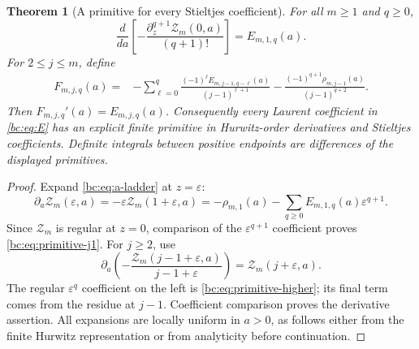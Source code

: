 \documentclass[11pt,letterpaper]{article}
\numberwithin{equation}{section}
\newtheorem{theorem}{Theorem}[section]
\theoremstyle{definition}
\theoremstyle{remark}
\newcommand{\bcZ}{\mathcal Z}
\begin{document}
\begin{theorem}[A primitive for every Stieltjes coefficient]
\label{bc:thm:primitives}
For all $m\ge1$ and $q\ge0$,
\begin{equation}\label{bc:eq:primitive-j1}
 \frac{d}{da}\left[-\frac{\partial_z^{q+1}\bcZ_m(0,a)}{(q+1)!}\right]
        =E_{m,1,q}(a).
\end{equation}
For $2\le j\le m$, define
\begin{align}
 F_{m,j,q}(a)={}&-
  \sum_{\ell=0}^{q}\frac{(-1)^\ell E_{m,j-1,q-\ell}(a)}{(j-1)^{\ell+1}}
  -\frac{(-1)^{q+1}\rho_{m,j-1}(a)}{(j-1)^{q+2}}.
 \label{bc:eq:primitive-higher}
\end{align}
Then $F_{m,j,q}'(a)=E_{m,j,q}(a)$. Consequently every Laurent
coefficient in \eqref{bc:eq:E} has an explicit finite primitive in
Hurwitz-order derivatives and Stieltjes coefficients. Definite
integrals between positive endpoints are differences of the displayed
primitives.
\end{theorem}
\begin{proof}
Expand \eqref{bc:eq:a-ladder} at $z=\varepsilon$:
\[
 \partial_a\bcZ_m(\varepsilon,a)
   =-\varepsilon\bcZ_m(1+\varepsilon,a)
   =-\rho_{m,1}(a)-\sum_{q\ge0}E_{m,1,q}(a)\varepsilon^{q+1}.
\]
Since $\bcZ_m$ is regular at $z=0$, comparison of the
$\varepsilon^{q+1}$ coefficient proves
\eqref{bc:eq:primitive-j1}. For $j\ge2$, use
\[
 \partial_a\left(-\frac{\bcZ_m(j-1+\varepsilon,a)}{j-1+\varepsilon}\right)
     =\bcZ_m(j+\varepsilon,a).
\]
The regular $\varepsilon^q$ coefficient on the left is
\eqref{bc:eq:primitive-higher}; its final term comes from the residue at
$j-1$. Coefficient comparison proves the derivative assertion. All
expansions are locally uniform in $a>0$, as follows either from the
finite Hurwitz representation or from analyticity before continuation.
\end{proof}
\end{document}
